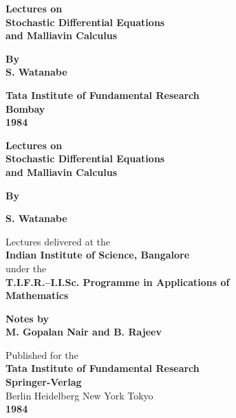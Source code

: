\thispagestyle{empty}
\begin{center}
{\Large\bf Lectures on}\\[5pt]
{\Large\bf Stochastic Differential Equations}\\[5pt]
{\Large\bf and Malliavin Calculus}
\vskip 1cm

{\bf By}\\[5pt]
{\large\bf S. Watanabe}
\vfill


{\bf Tata Institute of Fundamental Research}\\
{\bf Bombay}\\
{\bf 1984}
\end{center}
\eject

\thispagestyle{empty}
\begin{center}
{\Large\bf Lectures on}\\[5pt]
{\Large\bf Stochastic Differential Equations}\\[5pt]
{\Large\bf and Malliavin Calculus}
\vskip 1cm

{\bf By}
\medskip

{\large\bf S. Watanabe}
\vfill

{Lectures delivered at the}\\[5pt]
{\large\bf Indian Institute of Science, Bangalore}\\[7pt]
{under the }\\[7pt]
{\large\bf T.I.F.R.--I.I.Sc. Programme in Applications of}\\
{\large\bf Mathematics}

\vfill

{\bf Notes by}\\[5pt]
{\large\bf M. Gopalan Nair and B. Rajeev}

\vfill

{Published for the}\\
{\bf Tata Institute of Fundamental Research}\\
{\bf Springer-Verlag}\\
{Berlin Heidelberg New York Tokyo}\\
{\bf 1984}
\end{center}

\eject

